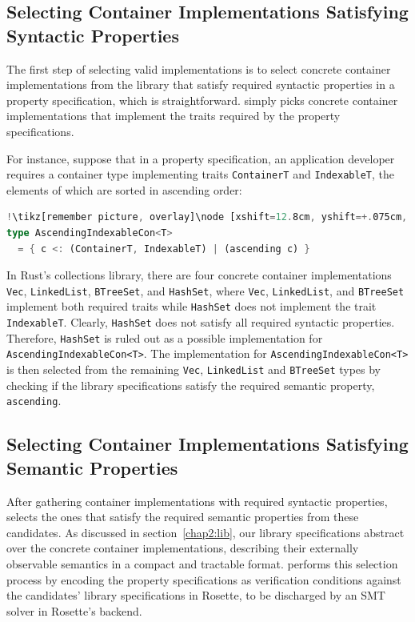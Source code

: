 \subsection{Selecting Container Implementations Satisfying Syntactic Properties}
\label{chap2:select:syntactic}
The first step of selecting valid implementations is to select concrete container implementations from the library that satisfy required syntactic properties in a property specification, which is straightforward. \Primrose{} simply picks concrete container implementations that implement the traits required by the property specifications. 

For instance, suppose that in a property specification, an application developer requires a container type implementing traits \lstinline|ContainerT| and \lstinline|IndexableT|, the elements of which are sorted in ascending order:
\begin{lstlisting}[language=Rust, style=boxed, caption={A property specification composing semantic and syntactic properties: \mylstinline{ascending}, \mylstinline{ContainerT}, and \mylstinline{IndexableT}}, captionpos=t, label=select:ascending-random-eg]
!\tikz[remember picture, overlay]\node [xshift=12.8cm, yshift=+.075cm, inner sep=0.075cm, rectangle] {\footnotesize\bfseries\texttt{Primrose}};!property ascending { \c -> (for-all-consecutive-pairs c leq?) }
type AscendingIndexableCon<T>
  = { c <: (ContainerT, IndexableT) | (ascending c) }
\end{lstlisting}
In Rust's collections library, there are four concrete container implementations \lstinline|Vec|, \lstinline|LinkedList|, \lstinline|BTreeSet|, and \lstinline|HashSet|, where \lstinline|Vec|, \lstinline|LinkedList|, and \lstinline|BTreeSet| implement both required traits while \lstinline|HashSet| does not implement the trait \lstinline|IndexableT|. Clearly, \lstinline|HashSet| does not satisfy all required syntactic properties. Therefore, \lstinline|HashSet| is ruled out as a possible implementation for \lstinline{AscendingIndexableCon<T>}. 
The implementation for \lstinline{AscendingIndexableCon<T>} is then selected from the remaining \lstinline|Vec|, \lstinline|LinkedList| and \lstinline|BTreeSet| types by checking if the library specifications satisfy the required semantic property, \lstinline|ascending|.

\subsection{Selecting Container Implementations Satisfying Semantic Properties}
\label{chap2:select:semantic}
After gathering container implementations with required syntactic properties, \Primrose{} selects the ones that satisfy the required semantic properties from these candidates. As discussed in section~\ref{chap2:lib}, our library specifications abstract over the concrete container implementations, describing their externally observable semantics in a compact and tractable format.
\Primrose{} performs this selection process by encoding the property specifications as verification conditions against the candidates' library specifications in Rosette, to be discharged by an SMT solver in Rosette's backend.

